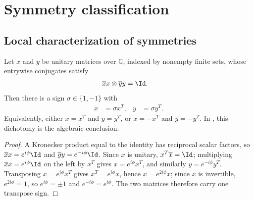 \section{Symmetry classification}

\subsection{Local characterization of symmetries}

\begin{lemma}
    \label{thm:mpu_conjugation_common_transpose_sign}
    \leanok
    Let $x$ and $y$ be unitary matrices over $\mathbb C$, indexed by nonempty
    finite sets, whose entrywise conjugates satisfy
    \begin{align}
        \overline xx\otimes\overline yy & =\Id.
    \end{align}
    Then there is a sign $\sigma\in\{1,-1\}$ with
    \begin{align}
        x & =\sigma x^T, & y & =\sigma y^T.
    \end{align}
    Equivalently, either $x=x^T$ and $y=y^T$, or $x=-x^T$ and $y=-y^T$.
    In \cite[lines~1033--1038]{Cirac2017MPU}, this dichotomy is the algebraic
    conclusion.
\end{lemma}

\begin{proof}\leanok
    A Kronecker product equal to the identity has reciprocal scalar factors, so
    $\overline xx=e^{i\phi}\Id$ and $\overline yy=e^{-i\phi}\Id$. Since $x$ is
    unitary, $x^T\overline x=\Id$; multiplying $\overline xx=e^{i\phi}\Id$ on the left by $x^T$ gives $x=e^{i\phi}x^T$, and similarly
    $y=e^{-i\phi}y^T$. Transposing $x=e^{i\phi}x^T$ gives $x^T=e^{i\phi}x$, hence
    $x=e^{2i\phi}x$; since $x$ is invertible, $e^{2i\phi}=1$, so $e^{i\phi}=\pm1$ and
    $e^{-i\phi}=e^{i\phi}$. The two matrices therefore carry one transpose sign.
\end{proof}

